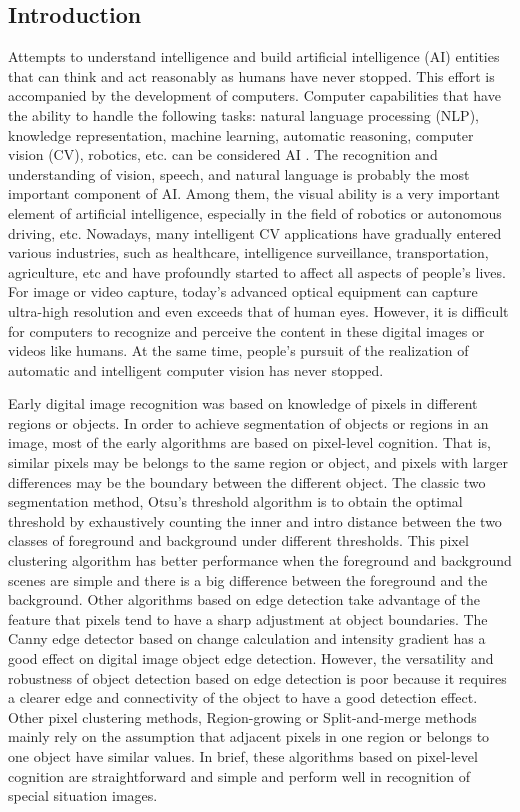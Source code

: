 \documentclass[10pt, a4paper]{article}
\begin{document}
\begin{multicols}{2}
	\section{Introduction} \justify
	Attempts to understand intelligence and build artificial intelligence (AI) entities that can think and act reasonably as humans have never stopped. This effort is accompanied by the development of computers. Computer capabilities that have the ability to handle the following tasks: natural language processing (NLP), knowledge representation, machine learning, automatic reasoning, computer vision (CV), robotics, etc. can be considered AI \cite{russell2002artificial} . The recognition and understanding of vision, speech, and natural language is probably the most important component of AI. Among them, the visual ability is a very important element of artificial intelligence, especially in the field of robotics or autonomous driving, etc. Nowadays, many intelligent CV applications have gradually entered various industries, such as healthcare, intelligence surveillance, transportation, agriculture, etc and have profoundly started to affect all aspects of people's lives. For image or video capture, today’s advanced optical equipment can capture ultra-high resolution and even exceeds that of human eyes. However, it is difficult for computers to recognize and perceive the content in these digital images or videos like humans. At the same time, people's pursuit of the realization of automatic and intelligent computer vision has never stopped.
	\par 	
	Early digital image recognition was based on knowledge of pixels in different regions or objects. In order to achieve segmentation of objects or regions in an image, most of the early algorithms are based on pixel-level cognition. That is, similar pixels may be belongs to the same region or object, and pixels with larger differences may be the boundary between the different object. The classic two segmentation method, Otsu’s threshold algorithm \cite{otsu1979threshold} is to obtain the optimal threshold by exhaustively counting the inner and intro distance between the two classes of foreground and background under different thresholds. This pixel clustering algorithm has better performance when the foreground and background scenes are simple and there is a big difference between the foreground and the background. Other algorithms based on edge detection take advantage of the feature that pixels tend to have a sharp adjustment at object boundaries. The Canny edge detector \cite{canny1986computational} based on change calculation and intensity gradient has a good effect on digital image object edge detection. However, the versatility and robustness of object detection based on edge detection is poor because it requires a clearer edge and connectivity of the object to have a good detection effect. Other pixel clustering methods, Region-growing or Split-and-merge methods mainly rely on the assumption that adjacent pixels in one region or belongs to one object have similar values. In brief, these algorithms based on pixel-level cognition are straightforward and simple and perform well in recognition of special situation images.

\end{multicols}
\end{document}
